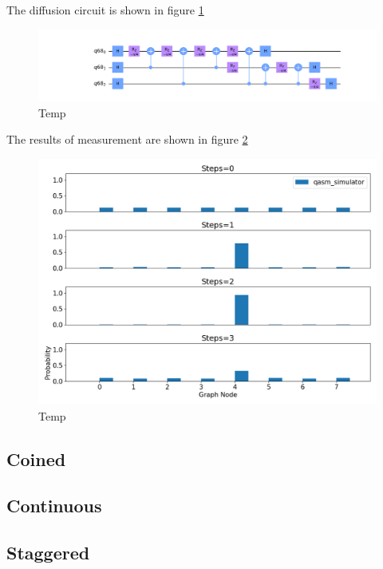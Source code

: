 \documentclass[../../dissertation.tex]{subfiles}
\begin{document}
The diffusion circuit is shown in figure \ref{fig:groverDiffCircuitQistkit}
\begin{figure}[!h]
	\centering
	\includegraphics[scale=0.30]{img/Qiskit/GroverQiskit/Circuits/GroverQiskitCircDiff_N3_M4_S3.png}
	\caption{Temp}
	\label{fig:groverDiffCircuitQistkit}
\end{figure}\par
The results of measurement are shown in figure \ref{fig:groverQiskitDist}
\begin{figure}[!h]
	\centering
	\includegraphics[scale=0.40]{img/Qiskit/GroverQiskit/GroverQiskitSearch_N3_M4_S0123}
	\caption{Temp}
	\label{fig:groverQiskitDist}
\end{figure}
%
\subsection{Coined}
%

\subsection{Continuous}
\subsection{Staggered}
\end{document}

